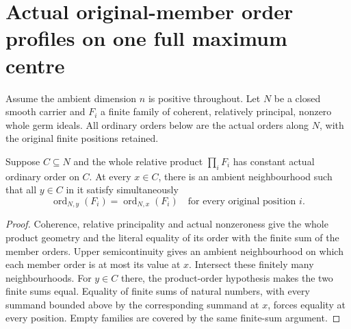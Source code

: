 \section{Actual original-member order profiles on one full maximum centre}

Assume the ambient dimension $n$ is positive throughout.
Let $N$ be a closed smooth carrier and $F_i$ a finite family of coherent,
relatively principal, nonzero whole germ ideals. All ordinary orders below
are the actual orders along $N$, with the original finite positions retained.

\begin{theorem}
\label{hir:sharp-actual-family-member-orders-on-product-stratum}
Suppose $C\subseteq N$ and the whole relative product $\prod_i F_i$ has
constant actual ordinary order on $C$. At every $x\in C$, there is an
ambient neighbourhood such that all $y\in C$ in it satisfy simultaneously
\[
 \operatorname{ord}_{N,y}(F_i)=\operatorname{ord}_{N,x}(F_i)
 \quad\text{for every original position }i.
\]
\leanok
\end{theorem}
\begin{proof}
Coherence, relative principality and actual nonzeroness give the whole
product geometry and the literal equality of its order with the finite
sum of the member orders. Upper semicontinuity gives an ambient
neighbourhood on which each member order is at most its value at $x$.
Intersect these finitely many neighbourhoods. For $y\in C$ there, the
product-order hypothesis makes the two finite sums equal. Equality of
finite sums of natural numbers, with every summand bounded above by the
corresponding summand at $x$, forces equality at every position. Empty
families are covered by the same finite-sum argument.
\end{proof}

